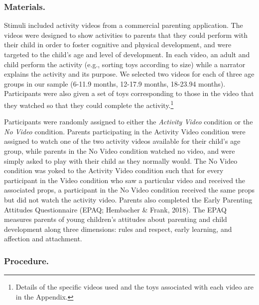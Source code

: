 \documentclass[man,floatsintext]{apa6}
\let\rmarkdownfootnote\footnote%
\def\footnote{\protect\rmarkdownfootnote}
\begin{document}
\hypertarget{materials.}{%
\subsubsection{Materials.}\label{materials.}}

Stimuli included activity videos from a commercial parenting application.
The videos were designed to show activities to parents that they could perform with their child in order to foster cognitive and physical development, and were targeted to the child's age and level of development.
In each video, an adult and child perform the activity (e.g., sorting toys according to size) while a narrator explains the activity and its purpose.
We selected two videos for each of three age groups in our sample (6-11.9 months, 12-17.9 months, 18-23.94 months).
Participants were also given a set of toys corresponding to those in the video that they watched so that they could complete the activity.\footnote{Details of the specific videos used and the toys associated with each video are in the Appendix.}

Participants were randomly assigned to either the \emph{Activity Video} condition or the \emph{No Video} condition.
Parents participating in the Activity Video condition were assigned to watch one of the two activity videos available for their child's age group, while parents in the No Video condition watched no video, and were simply asked to play with their child as they normally would.
The No Video condition was yoked to the Activity Video condition such that for every participant in the Video condition who saw a particular video and received the associated props, a participant in the No Video condition received the same props but did not watch the activity video.
Parents also completed the Early Parenting Attitudes Questionnaire (EPAQ; Hembacher \& Frank, 2018).
The EPAQ measures parents of young children's attitudes about parenting and child development along three dimensions: rules and respect, early learning, and affection and attachment.

\hypertarget{procedure.}{%
\subsubsection{Procedure.}\label{procedure.}}
\end{document}
